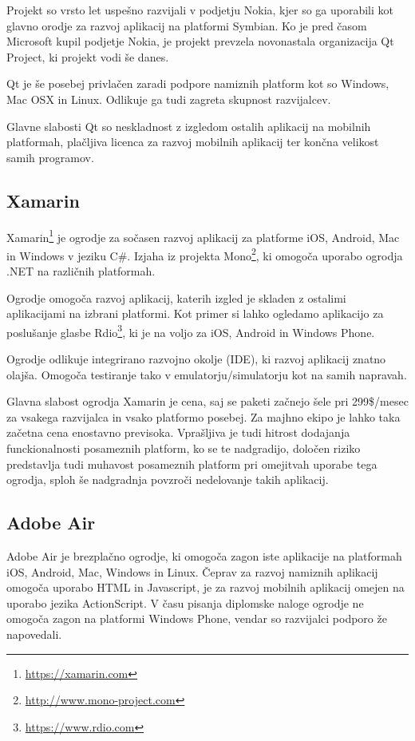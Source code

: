 Projekt so vrsto let uspešno razvijali v podjetju Nokia, kjer so ga uporabili kot glavno orodje za razvoj aplikacij na platformi Symbian. Ko je pred časom Microsoft kupil podjetje Nokia, je projekt prevzela novonastala organizacija Qt Project, ki projekt vodi še danes.

Qt je še posebej privlačen zaradi podpore namiznih platform kot so Windows, Mac OSX in Linux. Odlikuje ga tudi zagreta skupnost razvijalcev.

Glavne slabosti Qt so neskladnost z izgledom ostalih aplikacij na mobilnih platformah, plačljiva licenca za razvoj mobilnih aplikacij ter končna velikost samih programov.

\subsection{Xamarin}

Xamarin\footnote{\href{https://xamarin.com}{https://xamarin.com}} je ogrodje za sočasen razvoj aplikacij za platforme iOS, Android, Mac in Windows v jeziku C\#. Izjaha iz projekta Mono\footnote{\href{http://www.mono-project.com}{http://www.mono-project.com}}, ki omogoča uporabo ogrodja .NET na različnih platformah.

Ogrodje omogoča razvoj aplikacij, katerih izgled je skladen z ostalimi aplikacijami na izbrani platformi. Kot primer si lahko ogledamo aplikacijo za poslušanje glasbe Rdio\footnote{\href{https://www.rdio.com}{https://www.rdio.com}}, ki je na voljo za iOS, Android in Windows Phone.

Ogrodje odlikuje integrirano razvojno okolje (IDE), ki razvoj aplikacij znatno olajša. Omogoča testiranje tako v emulatorju/simulatorju kot na samih napravah.

Glavna slabost ogrodja Xamarin je cena, saj se paketi začnejo šele pri 299\$/mesec za vsakega razvijalca in vsako platformo posebej. Za majhno ekipo je lahko taka začetna cena enostavno previsoka. Vprašljiva je tudi hitrost dodajanja funckionalnosti posameznih platform, ko se te nadgradijo, določen riziko predstavlja tudi muhavost posameznih platform pri omejitvah uporabe tega ogrodja, sploh še nadgradnja povzroči nedelovanje takih aplikacij.

\subsection{Adobe Air}

Adobe Air je brezplačno ogrodje, ki omogoča zagon iste aplikacije na platformah iOS, Android, Mac, Windows in Linux. Čeprav za razvoj namiznih aplikacij omogoča uporabo HTML in Javascript, je za razvoj mobilnih aplikacij omejen na uporabo jezika ActionScript. V času pisanja diplomske naloge ogrodje ne omogoča zagon na platformi Windows Phone, vendar so razvijalci podporo že napovedali.

